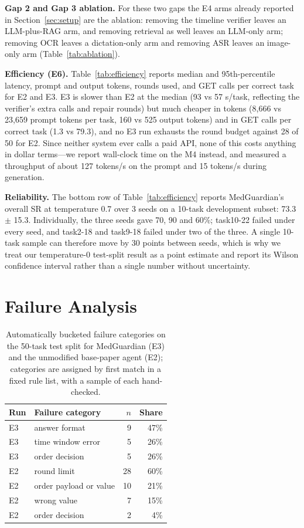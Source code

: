 \documentclass[conference]{IEEEtran}
\begin{document}
\textbf{Gap 2 and Gap 3 ablation.} For these two gaps the E4 arms already reported in Section~\ref{sec:setup} are the ablation: removing the timeline verifier leaves an LLM-plus-RAG arm, and removing retrieval as well leaves an LLM-only arm; removing OCR leaves a dictation-only arm and removing ASR leaves an image-only arm (Table~\ref{tab:ablation}).

\textbf{Efficiency (E6).} Table~\ref{tab:efficiency} reports median and 95th-percentile latency, prompt and output tokens, rounds used, and GET calls per correct task for E2 and E3. E3 is slower than E2 at the median (93 vs 57 s/task, reflecting the verifier's extra calls and repair rounds) but much cheaper in tokens (8,666 vs 23,659 prompt tokens per task, 160 vs 525 output tokens) and in GET calls per correct task (1.3 vs 79.3), and no E3 run exhausts the round budget against 28 of 50 for E2. Since neither system ever calls a paid API, none of this costs anything in dollar terms---we report wall-clock time on the M4 instead, and measured a throughput of about 127 tokens/s on the prompt and 15 tokens/s during generation.

\textbf{Reliability.} The bottom row of Table~\ref{tab:efficiency} reports MedGuardian's overall SR at temperature 0.7 over 3 seeds on a 10-task development subset: 73.3 $\pm$ 15.3. Individually, the three seeds gave 70, 90 and 60\%; task10-22 failed under every seed, and task2-18 and task9-18 failed under two of the three. A single 10-task sample can therefore move by 30 points between seeds, which is why we treat our temperature-0 test-split result as a point estimate and report its Wilson confidence interval rather than a single number without uncertainty.

\section{Failure Analysis}\label{sec:failure}

\begin{table}[t]
\centering
\small
\caption{Automatically bucketed failure categories on the 50-task test split for MedGuardian (E3) and the unmodified base-paper agent (E2); categories are assigned by first match in a fixed rule list, with a sample of each hand-checked.}
\label{tab:failures}
\begin{tabular}{llrr}
\toprule
\textbf{Run} & \textbf{Failure category} & $n$ & \textbf{Share} \\
\midrule
E3 & answer format & 9 & 47\% \\
E3 & time window error & 5 & 26\% \\
E3 & order decision & 5 & 26\% \\
E2 & round limit & 28 & 60\% \\
E2 & order payload or value & 10 & 21\% \\
E2 & wrong value & 7 & 15\% \\
E2 & order decision & 2 & 4\% \\
\bottomrule
\end{tabular}
\end{table}
\end{document}
